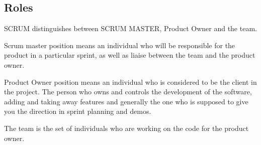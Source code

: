 \subsection{Roles}

SCRUM distinguishes between SCRUM MASTER, Product Owner and the team. 

Scrum master position means an individual who will be responsible for the product in a particular sprint, as well as liaise between the team and the product owner.

Product Owner position means an individual who is considered to be the client in the project. The person who owns and controls the development of the software, adding and taking away features and generally the one who is supposed to give you the direction in sprint planning and demos.

The team is the set of individuals who are working on the code for the product owner.